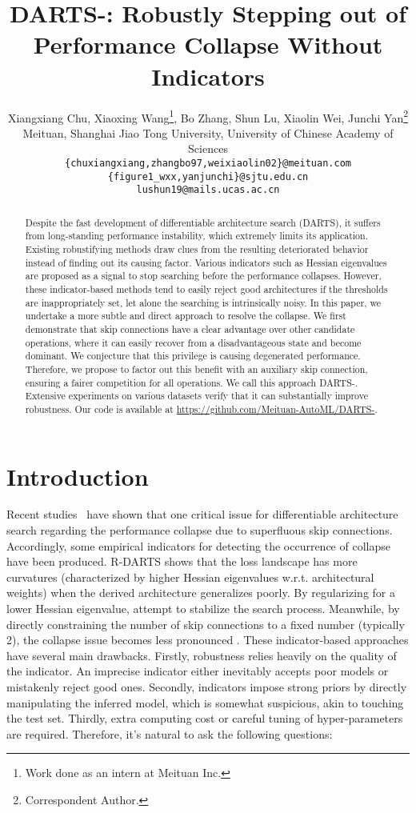 \documentclass{article} \usepackage{iclr2021_conference,times}
\title{DARTS-: Robustly Stepping out of Performance Collapse Without Indicators}
\author{Xiangxiang Chu, Xiaoxing Wang\thanks{Work done as an intern at Meituan Inc.}, Bo Zhang, Shun Lu,  Xiaolin Wei, Junchi Yan\thanks{Correspondent Author.} \\
	Meituan, Shanghai Jiao Tong University, University of Chinese Academy of Sciences\\
	\texttt{\{chuxiangxiang,zhangbo97,weixiaolin02\}@meituan.com} \\
	\texttt{\{figure1\_wxx,yanjunchi\}@sjtu.edu.cn} \\
    \texttt{lushun19@mails.ucas.ac.cn} \\
}
\begin{document}
\maketitle


\begin{abstract}

Despite the fast development of differentiable architecture search (DARTS), it suffers from long-standing performance instability, which extremely limits its application. Existing robustifying methods draw clues from the resulting deteriorated behavior instead of finding out its causing factor. Various indicators such as Hessian eigenvalues are proposed as a signal to stop searching before the performance collapses. However, these indicator-based methods tend to easily reject good architectures if the thresholds are inappropriately set, let alone the searching is intrinsically noisy. In this paper, we undertake a more subtle and direct approach to resolve the collapse. 
We first demonstrate that skip connections have a clear advantage over other candidate operations, where it can easily recover from a disadvantageous state and become dominant. We conjecture that this privilege is causing  degenerated performance. Therefore, we propose to factor out this benefit with an auxiliary skip connection, ensuring a fairer competition for all operations. We call this approach DARTS-.
Extensive experiments on various datasets verify that it can substantially improve robustness. Our code is available at \url{https://github.com/Meituan-AutoML/DARTS-}. 

\end{abstract}


\section{Introduction}
Recent studies~\citep{zela2020understanding,liang2019darts,chu2019fair} have shown that one critical issue for differentiable architecture search \citep{liu2018darts} regarding the performance collapse due to superfluous skip connections. Accordingly, some empirical indicators for detecting the occurrence of collapse have been produced. R-DARTS \citep{zela2020understanding} shows that the loss landscape has more curvatures (characterized by higher Hessian eigenvalues w.r.t. architectural weights) when the derived architecture generalizes poorly. By regularizing for a lower Hessian eigenvalue, \cite{zela2020understanding,chen2020stabilizing} attempt to stabilize the search process. Meanwhile, by directly constraining the number of skip connections to a fixed number (typically 2), the collapse issue becomes less pronounced \citep{chen2019progressive,liang2019darts}.
These indicator-based approaches have several main drawbacks. Firstly, robustness relies heavily on the quality of the indicator.  An imprecise indicator either inevitably accepts poor models or mistakenly reject good ones. Secondly, indicators impose strong priors by directly manipulating the inferred model, which is somewhat suspicious, akin to touching the test set. Thirdly, extra computing cost \citep{zela2020understanding} or careful tuning of hyper-parameters \citep{chen2019progressive,liang2019darts} are required. Therefore, it's natural to ask the following questions:
\end{document}
